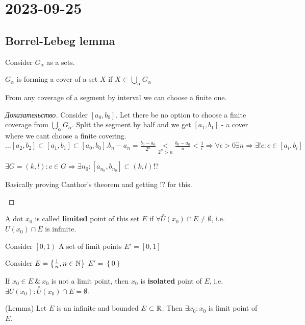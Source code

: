 \section{2023-09-25}

\subsection{Borrel-Lebeg lemma}

Consider $G_\alpha$ as a sets.

$G_\alpha$ is forming a cover of a set $X$ if $X \subset \bigcup_{\alpha} G_\alpha$

\begin{lemma}
	From any coverage of a segment by interval we can choose a finite one.
\end{lemma}

\begin{proof}[Доказательство]
	Consider $\left[ a_0,b_0 \right]$. Let there be no option to choose a finite coverage from $\bigcup_{\alpha} G_\alpha$. Split the segment by half and we get $\left[ a_1, b_1 \right]$ - a cover where we cant choose a finite covering. $ \dots \left[a_2, b_2 \right] \subset \left[ a_1,b_1 \right] \subset \left[ a_0, b_0 \right]. b_n - a_n = \frac{b_0-a_0}{2^{n}} \underset{2^{n} > n} < \frac{b_0-a_0}{n} < \frac{1}{\epsilon} \Rightarrow \forall \epsilon > 0 \exists n \Rightarrow \exists ! c: c \in \left[ a_i, b_i \right]$

	$\exists G = \left( k,l \right): c \in G \Rightarrow \exists n_0: \left[ a_{n_0}, b_{n_0} \right] \subset \left( k,l \right) !? $
	\begin{note}[]
		Basically proving Canthor's theorem and getting !? for this.
	\end{note}
\end{proof}

\begin{lemma}
	\begin{definition}[]
		A dot $x_0$ is called \textbf{limited} point of this set $E$ if $\forall \overset{\circ} U (x_0) \cap E \neq \emptyset$, i.e. $U(x_0) \cap E$ is infinite.

		\begin{example}[]
			Consider $\left[ 0, 1 \right)$
			A set of limit points $E' = \left[ 0,1 \right]$
		\end{example}

		\begin{example}[]
			Consider $E = \left\{ \frac{1}{n}, n \in \mathbb{N} \right \} $
			$E' = \left\{ 0 \right \} $
		\end{example}
		
		\begin{definition}[]
			If $x_0 \in E \ \& \ x_0$ is not a limit point, then $x_0$ is \textbf{isolated} point of $E$, i.e. $\exists U(x_0): \overset{\circ} U (x_0) \cap E = \emptyset$.
		\end{definition}
	\end{definition}

	(Lemma) Let $E$ is an infinite and bounded $E \subset \mathbb{R}$. Then $\exists x_0: x_0$ is limit point of $E$.
\end{lemma}

